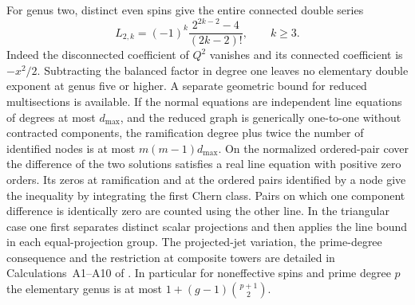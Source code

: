 For genus two, distinct even spins give the entire connected double series
\[
 L_{2,k}=(-1)^k\frac{2^{2k-2}-4}{(2k-2)!},\qquad k\ge3 .
\]
Indeed the disconnected coefficient of \(Q^2\) vanishes and its connected coefficient is \(-x^2/2\). Subtracting the balanced factor in degree one leaves no elementary double exponent at genus five or higher. A separate geometric bound for reduced multisections is available. If the normal equations are independent line equations of degrees at most \(d_{\max}\), and the reduced graph is generically one-to-one without contracted components, the ramification degree plus twice the number of identified nodes is at most \(m(m-1)d_{\max}\). On the normalized ordered-pair cover the difference of the two solutions satisfies a real line equation with positive zero orders. Its zeros at ramification and at the ordered pairs identified by a node give the inequality by integrating the first Chern class. Pairs on which one component difference is identically zero are counted using the other line. In the triangular case one first separates distinct scalar projections and then applies the line bound in each equal-projection group. The projected-jet variation, the prime-degree consequence and the restriction at composite towers are detailed in Calculations~A1--A10 of \cite{WueSupplement}. In particular for noneffective spins and prime degree \(p\) the elementary genus is at most \(1+(g-1)\binom{p+1}{2}\).

